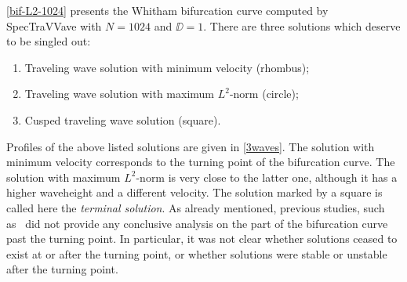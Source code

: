 \autoref{bif-L2-1024} %
presents the Whitham bifurcation curve computed by \textsf{SpecTraVVave} 
with $N=1024$ and $\DD=1$. 
There are three solutions which deserve to be singled out:
\begin{enumerate}
	\item Traveling wave solution with minimum velocity (rhombus);
	\item Traveling wave solution with maximum $L^2$-norm (circle);
	\item Cusped traveling wave solution (square).
\end{enumerate}
Profiles of the above listed solutions are given in \autoref{3waves}.
The solution with minimum velocity corresponds to the turning point of the bifurcation curve.
The solution with maximum $L^2$-norm is very close to the latter one, although it has a higher waveheight 
and a different velocity.
The solution marked by a square is called here the \emph{terminal solution}.
As already mentioned, previous studies, such as~\cite{EK1,EK2} did not provide any conclusive
analysis on the part of the bifurcation curve past the turning point.
In particular, it was not clear whether solutions ceased to exist
at or after the turning point, or whether solutions were stable
or unstable after the turning point. 

